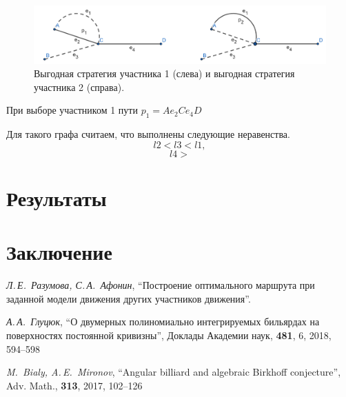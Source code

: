 \documentclass[12pt, a4paper]{article}
\begin{document}
\begin{figure}[hpt]
	\includegraphics[scale = 0.3]{imgs/no_nocoop_rovn.png}
	\centering
	\caption{Выгодная стратегия участника 1 (слева) и выгодная стратегия участника 2 (справа).}
	\label{fig:nocoop_str}
\end{figure}

При выборе участником 1 пути $p_1 = Ae_2Ce_4D$ 

Для такого графа считаем, что выполнены следующие неравенства.
$$l2 < l3 < l1,$$
$$l4 > $$
\fi

\newpage
\section{Результаты}

\newpage
\section{Заключение}

    \newpage
\begin{thebibliography}{0}
	

	 \textit{Л.\,Е.~Разумова, С.\,А.~Афонин},  ``Построение оптимального маршрута при заданной модели движения других участников движения''.
	
	 \textit{А.\,А.~Глуцюк}, ``О двумерных полиномиально интегрируемых бильярдах на поверхностях постоянной кривизны'', Доклады Академии наук, \textbf{481}, 6, 2018, 594--598
	
	 \textit{M.~Bialy, A.\,E.~Mironov}, ``Angular billiard and algebraic Birkhoff conjecture'', Adv. Math., \textbf{313}, 2017, 102--126
	
\end{thebibliography} 
\end{document}

